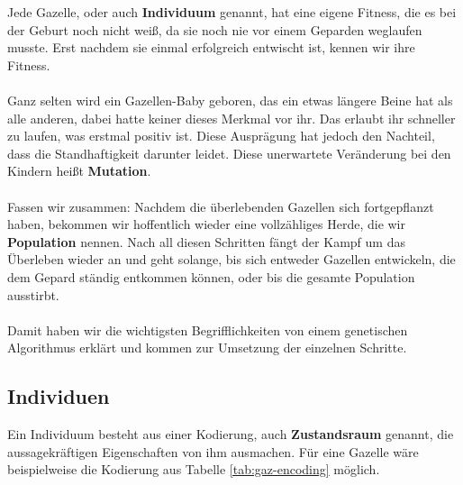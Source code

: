 \newpage
        \noindent
        Jede Gazelle, oder auch \textbf{Individuum} genannt, hat eine eigene Fitness, die es bei der Geburt noch nicht weiß, da sie noch nie vor einem Geparden weglaufen musste. Erst nachdem sie einmal erfolgreich entwischt ist, kennen wir ihre Fitness.\\
        \\
        Ganz selten wird ein Gazellen-Baby geboren, das ein etwas längere Beine hat als alle anderen, dabei hatte keiner dieses Merkmal vor ihr. Das erlaubt ihr schneller zu laufen, was erstmal positiv ist. Diese Ausprägung hat jedoch den Nachteil, dass die Standhaftigkeit darunter leidet. Diese unerwartete Veränderung bei den Kindern heißt \textbf{Mutation}.\\
        \\
        Fassen wir zusammen: Nachdem die überlebenden Gazellen sich fortgepflanzt haben, bekommen wir hoffentlich wieder eine vollzähliges Herde, die wir \textbf{Population} nennen. Nach all diesen Schritten fängt der Kampf um das Überleben wieder an und geht solange, bis sich entweder Gazellen entwickeln, die dem Gepard ständig entkommen können, oder bis die gesamte Population ausstirbt.\\
        \\
        Damit haben wir die wichtigsten Begrifflichkeiten von einem genetischen Algorithmus erklärt und kommen zur Umsetzung der einzelnen Schritte.

        \subsection{Individuen}

            Ein Individuum besteht aus einer Kodierung, auch \textbf{Zustandsraum} genannt, die aussagekräftigen Eigenschaften von ihm ausmachen. Für eine Gazelle wäre beispielweise die Kodierung aus Tabelle \ref{tab:gaz-encoding} möglich.

